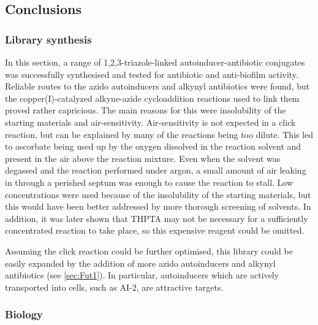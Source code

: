 \subsection{Conclusions}

\subsubsection{Library synthesis}

In this section, a range of 1,2,3-triazole-linked autoinducer-antibiotic conjugates was successfully synthesised and tested for antibiotic and anti-biofilm activity.
Reliable routes to the azido autoinducers and alkynyl antibiotics were found, but the copper(I)-catalyzed alkyne-azide cycloaddition reactions used to link them proved rather capricious.
The main reasons for this were insolubility of the starting materials and air-sensitivity. 
Air-sensitivity is not expected in a click reaction, but can be explained by many of the reactions being too dilute\cite{Hong2009}. 
This led to ascorbate being used up by the oxygen dissolved in the reaction solvent and present in the air above the reaction mixture. 
Even when the solvent was degassed and the reaction performed under argon, a small amount of air leaking in through a perished septum was enough to cause the reaction to stall.
Low concentrations were used because of the insolubility of the starting materials, but this would have been better addressed by more thorough screening of solvents.
In addition, it was later shown that THPTA may not be necessary for a sufficiently concentrated reaction to take place\cite{Stokes2017}, so this expensive reagent could be omitted.

Assuming the click reaction could be further optimised, this library could be easily expanded by the addition of more azido autoinducers and alkynyl antibiotics (see \ref{sec:Fut1}). In particular, autoinducers which are actively transported into cells, such as AI-2, are attractive targets.

\subsubsection{Biology}
